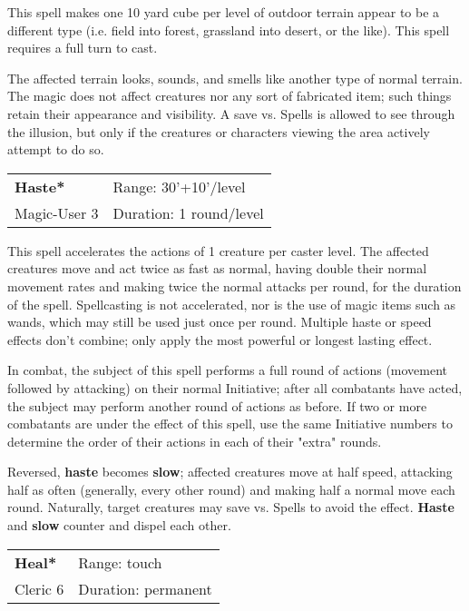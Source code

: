 \documentclass[a4paper,twoside,openany,10pt]{book}
\begin{document}
\begin{multicols}{2}
This spell makes one 10 yard cube per level of outdoor terrain appear to be a different type (i.e. field into forest, grassland into desert, or the like). This spell requires a full turn to cast.

The affected terrain looks, sounds, and smells like another type of normal terrain. The magic does not affect creatures nor any sort of fabricated item; such things retain their appearance and visibility. A save vs. Spells is allowed to see through the illusion, but only if the creatures or characters viewing the area actively attempt to do so. 

\smallskip\begin{flushleft} 
	\begin{tabularx}{0.45\textwidth}{@{}m{3.5cm}m{5.5cm}@{}} 
		\textbf{Haste*} & Range: 30'+10'/level\\
		Magic-User 3  & Duration: 1 round/level\\
	\end{tabularx}\end{flushleft}

This spell accelerates the actions of 1 creature per caster level. The affected creatures move and act twice as fast as normal, having double their normal movement rates and making twice the normal attacks per round, for the duration of the spell. Spellcasting is not accelerated, nor is the use of magic items such as wands, which may still be used just once per round. Multiple haste or speed effects don't combine; only apply the most powerful or longest lasting effect.

In combat, the subject of this spell performs a full round of actions (movement followed by attacking) on their normal Initiative; after all combatants have acted, the subject may perform another round of actions as before. If two or more combatants are under the effect of this spell, use the same Initiative numbers to determine the order of their actions in each of their "extra" rounds.

Reversed, \textbf{haste} becomes \textbf{slow}; affected creatures move at half speed, attacking half as often (generally, every other round) and making half a normal move each round. Naturally, target creatures may save vs. Spells to avoid the effect. \textbf{Haste} and \textbf{slow} counter and dispel each other.

\smallskip\begin{flushleft} 
	\begin{tabularx}{0.45\textwidth}{@{}m{3.5cm}m{5.5cm}@{}} 
		\textbf{Heal*} & Range: touch\\
Cleric 6 &Duration: permanent\\
	\end{tabularx}\end{flushleft}


\end{multicols}
\end{document}
